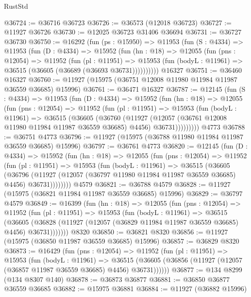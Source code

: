 \begin{lexlean}{RustStd}
\begin{coremodule}
@36724 := @36716 @36723
@36726 := @36573 (@12018 @36723)
@36727 := @11927 @36726
@36730 := @12025 @36723 @31406 @36694
@36731 := @36727 @36730
@36750 := @16292
    (fun (ps : @15950) =>
    @11953
      (fun (S : @4334) =>
      @11953
        (fun (D : @4334) =>
        @15952
          (fun (hn : @18) =>
          @12055
            (fun (pns : @12054) =>
            @11952
              (fun (pl : @11951) =>
              @15953 (fun (bodyL : @11961) => @36515 (@36605 (@36689 (@36693 @36731))))))))))
    @16327
@36751 := @36460 @16327
@36760 := @11927 (@15975 (@36751 @12008 @11980 @11984 @11987 @36559 @36685) @15996)
@36761 := @36471 @16327
@36787 := @12145
    (fun (S : @4334) =>
    @11953
      (fun (D : @4334) =>
      @15952
        (fun (hn : @18) =>
        @12055
          (fun (pns : @12054) =>
          @11952
            (fun (pl : @11951) =>
            @15953
              (fun (bodyL : @11961) =>
              @36515
                (@36605
                  (@36760
                    (@11927
                      (@12057 (@36761 @12008 @11980 @11984 @11987 @36559 @36685) @4456)
                      @36731)))))))))
    @4773
@36788 := @36751 @4773
@36796 := @11927 (@15975 (@36788 @11980 @11984 @11987 @36559 @36685) @15996)
@36797 := @36761 @4773
@36820 := @12145
    (fun (D : @4334) =>
    @15952
      (fun (hn : @18) =>
      @12055
        (fun (pns : @12054) =>
        @11952
          (fun (pl : @11951) =>
          @15953
            (fun (bodyL : @11961) =>
            @36515
              (@36605
                (@36796
                  (@11927 (@12057 (@36797 @11980 @11984 @11987 @36559 @36685) @4456) @36731))))))))
    @4579
@36821 := @36788 @4579
@36828 := @11927 (@15975 (@36821 @11984 @11987 @36559 @36685) @15996)
@36829 := @36797 @4579
@36849 := @16399
    (fun (hn : @18) =>
    @12055
      (fun (pns : @12054) =>
      @11952
        (fun (pl : @11951) =>
        @15953
          (fun (bodyL : @11961) =>
          @36515
            (@36605
              (@36828 (@11927 (@12057 (@36829 @11984 @11987 @36559 @36685) @4456) @36731)))))))
    @8320
@36850 := @36821 @8320
@36856 := @11927 (@15975 (@36850 @11987 @36559 @36685) @15996)
@36857 := @36829 @8320
@36873 := @16429
    (fun (pns : @12054) =>
    @11952
      (fun (pl : @11951) =>
      @15953
        (fun (bodyL : @11961) =>
        @36515 (@36605 (@36856 (@11927 (@12057 (@36857 @11987 @36559 @36685) @4456) @36731))))))
@36877 := @134 @8299 (@134 @8307 @140)
@36878 := @36873 @36877
@36881 := @36850 @36877 @36559 @36685
@36882 := @15975 @36881
@36884 := @11927 (@36882 @15996)

\end{coremodule}
\end{lexlean}
